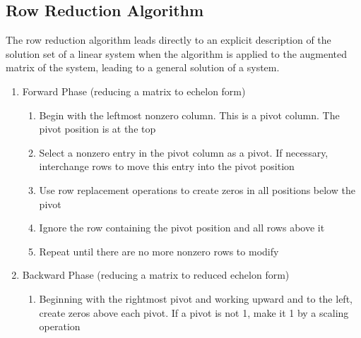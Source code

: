 \documentclass{article}
\begin{document}
\subsection*{Row Reduction Algorithm}
The row reduction algorithm leads directly to an explicit description of the solution set of a linear system when the algorithm is applied to the augmented matrix of the system, leading to a general solution of a system.
\begin{enumerate}
    \item Forward Phase (reducing a matrix to echelon form)
    \begin{enumerate}
        \item Begin with the leftmost nonzero column. This is a pivot column. The pivot position is at the top
        \item Select a nonzero entry in the pivot column as a pivot. If necessary, interchange rows to move this entry into the pivot position
        \item Use row replacement operations to create zeros in all positions below the pivot
        \item Ignore the row containing the pivot position and all rows above it
        \item Repeat until there are no more nonzero rows to modify    
    \end{enumerate}
    \item Backward Phase (reducing a matrix to reduced echelon form)
    \begin{enumerate}
        \item Beginning with the rightmost pivot and working upward and to the left, create zeros above each pivot. If a pivot is not 1, make it 1 by a scaling operation
    \end{enumerate}
\end{enumerate}
\end{document}
